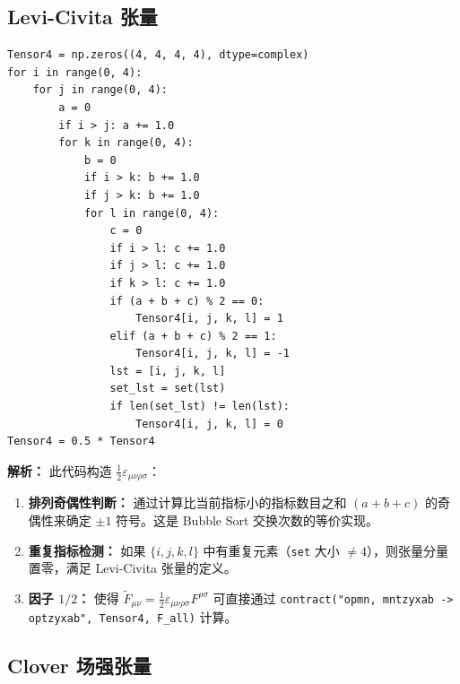 \documentclass[12pt,a4paper]{ctexart}
\begin{document}
\subsection{Levi-Civita 张量}

\begin{lstlisting}[caption={四维 Levi-Civita 张量构造}]
Tensor4 = np.zeros((4, 4, 4, 4), dtype=complex)
for i in range(0, 4):
    for j in range(0, 4):
        a = 0
        if i > j: a += 1.0
        for k in range(0, 4):
            b = 0
            if i > k: b += 1.0
            if j > k: b += 1.0
            for l in range(0, 4):
                c = 0
                if i > l: c += 1.0
                if j > l: c += 1.0
                if k > l: c += 1.0
                if (a + b + c) % 2 == 0:
                    Tensor4[i, j, k, l] = 1
                elif (a + b + c) % 2 == 1:
                    Tensor4[i, j, k, l] = -1
                lst = [i, j, k, l]
                set_lst = set(lst)
                if len(set_lst) != len(lst):
                    Tensor4[i, j, k, l] = 0
Tensor4 = 0.5 * Tensor4
\end{lstlisting}

\textbf{解析：}
此代码构造 $\frac{1}{2}\varepsilon_{\mu\nu\rho\sigma}$：

\begin{enumerate}
    \item \textbf{排列奇偶性判断：} 通过计算比当前指标小的指标数目之和 $(a+b+c)$ 的奇偶性来确定 $\pm 1$ 符号。这是 Bubble Sort 交换次数的等价实现。

    \item \textbf{重复指标检测：} 如果 $\{i,j,k,l\}$ 中有重复元素（\texttt{set} 大小 $\neq 4$），则张量分量置零，满足 Levi-Civita 张量的定义。

    \item \textbf{因子 $1/2$：} 使得 $\tilde{F}_{\mu\nu} = \frac{1}{2}\varepsilon_{\mu\nu\rho\sigma}F^{\rho\sigma}$ 可直接通过 \texttt{contract("opmn, mntzyxab -> optzyxab", Tensor4, F\_all)} 计算。
\end{enumerate}

\subsection{Clover 场强张量}
\end{document}
